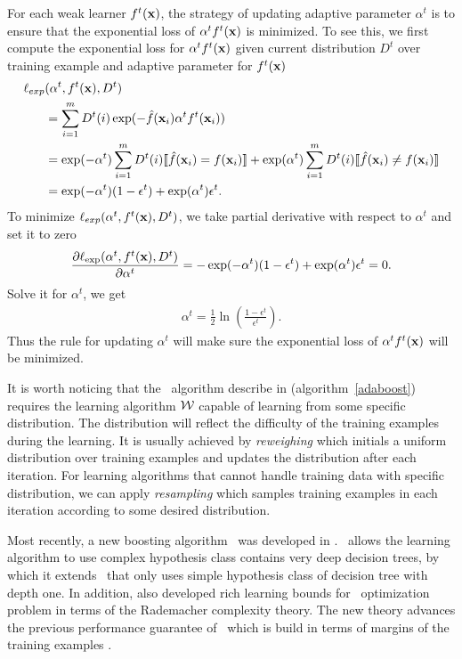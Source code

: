 {For each weak learner $f^t(\mathbf {x})$, the strategy of updating adaptive parameter $\alpha^t$ is to ensure that the exponential loss of $\alpha^tf^t(\mathbf {x})$ is minimized.
To see this, we first compute the exponential loss for $\alpha^tf^t(\mathbf {x})$ given current distribution $D^t$ over training example and adaptive parameter for $f^t(\mathbf {x})$
\begin{align*}
	\ell_{exp}&(\alpha^t,f^t(\mathbf {x}),D^t) \\
	&= \sum_{i=1}^mD^t(i)\exp(-{\hat{f}}(\mathbf {x}_i)\alpha^tf^t(\mathbf {x}_i))\\
	&=\exp(-\alpha^t)\sum_{i=1}^mD^t(i){\llbracket {\hat{f}}(\mathbf {x}_i)=f(\mathbf {x}_i) \rrbracket} + \exp(\alpha^t)\sum_{i=1}^mD^t(i){\llbracket {\hat{f}}(\mathbf {x}_i)\neq f(\mathbf {x}_i) \rrbracket}\\
	&=\exp(-\alpha^t)(1-\epsilon^t) + \exp(\alpha^t)\epsilon^t.
\end{align*}
To minimize $\ell_{exp}(\alpha^t,f^t(\mathbf {x}),D^t)$, we take partial derivative with respect to $\alpha^t$ and set it to zero
\begin{align*}
	\frac{\partial\ell_{\exp}(\alpha^t,f^t(\mathbf {x}),D^t)}{\partial\alpha^t} = -\exp(-\alpha^t)(1-\epsilon^t) + \exp(\alpha^t)\epsilon^t=0.
\end{align*}
Solve it for $\alpha^t$, we get
\begin{align*}
	\alpha^{t} = \frac{1}{2}\ln\left(\frac{1-\epsilon^t}{\epsilon^t}\right).
\end{align*}
Thus the rule for updating $\alpha^t$ will make sure the exponential loss of $\alpha^tf^t(\mathbf {x})$ will be minimized.

It is worth noticing that the \adaboost\ algorithm describe in (algorithm~\ref{adaboost}) requires the learning algorithm $\mathcal{W}$ capable of learning from some specific distribution.
The distribution will reflect the difficulty of the training examples during the learning.
It is usually achieved by \textit{reweighing} which initials a uniform distribution over training examples and updates the distribution after each iteration.
For learning algorithms that cannot handle training data with specific distribution, we can apply \textit{resampling} which samples training examples in each iteration according to some desired distribution.

Most recently, a new boosting algorithm \deepboosting\ was developed in \citep{Cortes14deep}.
\deepboosting\ allows the learning algorithm to use complex hypothesis class contains very deep decision trees, by which it extends \adaboost\ that only uses simple hypothesis class of decision tree with depth one.
In addition, \citet{Cortes14deep} also developed rich learning bounds for \deepboosting\ optimization problem in terms of the Rademacher complexity theory.
The new theory advances the previous performance guarantee of \adaboost\ which is build in terms of margins of the training examples \citep{Schapire97boosting,Koltchinskii00empirical}.


}
